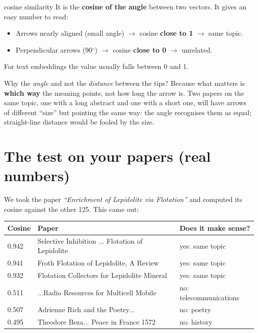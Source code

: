 \documentclass[11pt,a4paper]{article}
\begin{document}
\begin{concepto}{cosine similarity}
It is the \textbf{cosine of the angle} between two vectors. It gives an easy number to read:
\begin{itemize}
  \item Arrows nearly aligned (small angle) $\rightarrow$ cosine \textbf{close to 1}
        $\rightarrow$ same topic.
  \item Perpendicular arrows (90$^\circ$) $\rightarrow$ cosine \textbf{close to 0}
        $\rightarrow$ unrelated.
\end{itemize}
For text embeddings the value usually falls between 0 and 1.
\end{concepto}

\begin{ojo}
Why the \emph{angle} and not the \emph{distance} between the tips? Because what matters is
\textbf{which way} the meaning points, not how long the arrow is. Two papers on the same
topic, one with a long abstract and one with a short one, will have arrows of different
``size'' but pointing the same way: the angle recognises them as equal; straight-line
distance would be fooled by the size.
\end{ojo}

\section{The test on your papers (real numbers)}

We took the paper \emph{``Enrichment of Lepidolite via Flotation''} and computed its cosine
against the other 125. This came out:

\begin{center}
\begin{tabular}{lll}
\textbf{Cosine} & \textbf{Paper} & \textbf{Does it make sense?} \\
\hline
0.942 & Selective Inhibition ... Flotation of Lepidolite & yes: same topic \\
0.941 & Froth Flotation of Lepidolite, A Review & yes: same topic \\
0.932 & Flotation Collectors for Lepidolite Mineral & yes: same topic \\
\hline
0.511 & ...Radio Resources for Multicell Mobile & no: telecommunications \\
0.507 & Adrienne Rich and the Poetry... & no: poetry \\
0.495 & Theodore Beza... Peace in France 1572 & no: history \\
\end{tabular}
\end{center}
\end{document}
